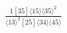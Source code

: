 \documentclass[varwidth, border=5pt]{standalone}
\begin{document}
\begin{my}
$\begin{gathered}
\scriptscriptstyle\frac{1[35]⟨15⟩⟨35⟩^2}{⟨13⟩^2[25]⟨34⟩⟨45⟩}
\end{gathered}$
\end{my}
\end{document}

